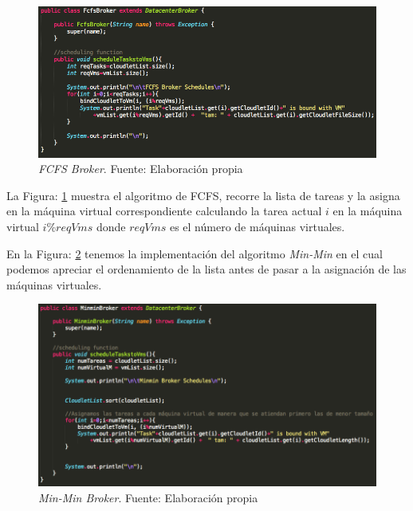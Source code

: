 \renewcommand\thefigure{\arabic{figure}}
\begin{figure}[h!]
	\centering
	\includegraphics[scale=0.4]{media/FCFS_broker}
	\caption{\textit{FCFS Broker}. Fuente: Elaboración propia}
	\label{fig:fcfsBroker}
\end{figure}

La Figura: \ref{fig:fcfsBroker} muestra el algoritmo de FCFS, recorre la lista de tareas y la asigna en la máquina virtual correspondiente calculando la tarea actual $i$ en la máquina virtual $i\%reqVms$ donde $reqVms$ es el número de máquinas virtuales.

\newpage

En la Figura: \ref{fig:minminBroker} tenemos la implementación del algoritmo \textit{Min-Min} en el cual podemos apreciar el ordenamiento de la lista antes de pasar a  la asignación de las máquinas virtuales.

\renewcommand\thefigure{\arabic{figure}}
\begin{figure}[h!]
	\centering
	\includegraphics[scale=0.4]{media/minmin_broker}
	\caption{\textit{Min-Min Broker}. Fuente: Elaboración propia}
	\label{fig:minminBroker}
\end{figure}

